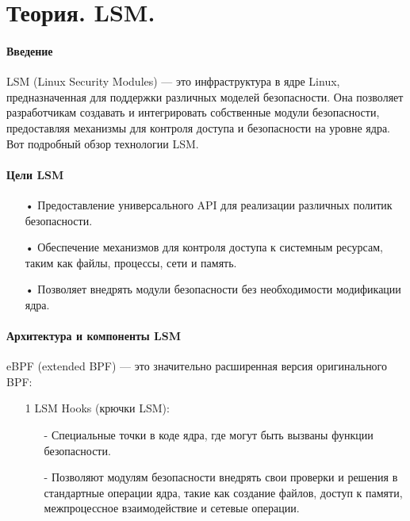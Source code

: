 \section{Теория. LSM.}
\label{theory-lsm-0}

\begin{flushleft}
	
	\paragraph{Введение}
	
	LSM (Linux Security Modules) — это инфраструктура в ядре Linux, предназначенная для поддержки различных моделей безопасности. Она позволяет разработчикам создавать и интегрировать собственные модули безопасности, предоставляя механизмы для контроля доступа и безопасности на уровне ядра. Вот подробный обзор технологии LSM.
	
	\paragraph{Цели LSM}
	
	\begin{itemize}
		\item[•] Предоставление универсального API для реализации различных политик безопасности.
		\item[•] Обеспечение механизмов для контроля доступа к системным ресурсам, таким как файлы, процессы, сети и память.
		\item[•] Позволяет внедрять модули безопасности без необходимости модификации ядра.
	\end{itemize}
	
	\paragraph{Архитектура и компоненты LSM}
	
	eBPF (extended BPF) — это значительно расширенная версия оригинального BPF:
	\begin{itemize}
		\item[1] LSM Hooks (крючки LSM):
			\begin{itemize}
				\item[-] Специальные точки в коде ядра, где могут быть вызваны функции безопасности.
				\item[-] Позволяют модулям безопасности внедрять свои проверки и решения в стандартные операции ядра, такие как создание файлов, доступ к памяти, межпроцессное взаимодействие и сетевые операции.
			\end{itemize}
			

\end{itemize}
\end{flushleft}
